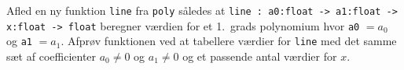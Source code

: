 \label{line} Afled en ny funktion \lstinline{line} fra \lstinline{poly} således at \lstinline{line : a0:float -> a1:float -> x:float -> float} beregner værdien for et 1.\ grads polynomium hvor \lstinline{a0} $=a_0$ og \lstinline{a1} $=a_1$. Afprøv funktionen ved at tabellere værdier for \lstinline{line} med det samme sæt af coefficienter $a_0\neq 0$ og $a_1\neq 0$ og et passende antal værdier for $x$.